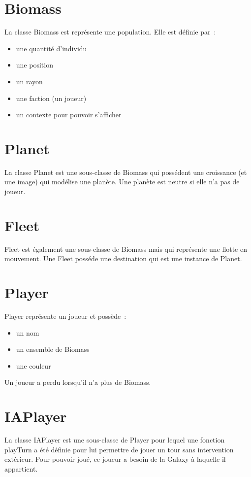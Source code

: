 \documentclass[a4paper]{report}
\begin{document}
\section*{Biomass}

La classe Biomass est représente une population. 
Elle est définie par :
\begin{itemize}
 \item une quantité d'individu
 \item une position
 \item un rayon
 \item une faction (un joueur)
 \item un contexte pour pouvoir s'afficher
\end{itemize}

\section*{Planet}

La classe Planet est une sous-classe de Biomass qui possédent une croissance (et une image) qui modélise une planète. Une planète est neutre si elle n'a pas de joueur.

\section*{Fleet}

Fleet est également une sous-classe de Biomass mais qui représente une flotte en mouvement. Une Fleet posséde une destination qui est une instance de Planet.

\section*{Player}

Player représente un joueur et possède :
\begin{itemize}
 \item un nom
 \item un ensemble de Biomass
 \item une couleur
\end{itemize}
Un joueur a perdu lorsqu'il n'a plus de Biomass.

\section*{IAPlayer}

La classe IAPlayer est une sous-classe de Player pour lequel une fonction playTurn a été définie pour lui permettre de jouer un tour sans intervention extérieur. Pour pouvoir joué, ce joueur a besoin de la Galaxy à laquelle il appartient.
\end{document}
